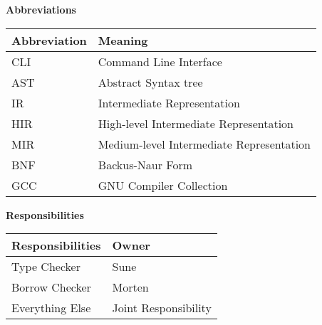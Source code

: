 \textbf{Abbreviations}
\begin{table}[H]
  \label{tab:}
  \begin{tabular}{|p{5cm}|p{5cm}|}
    \hline
    Abbreviation & Meaning\\
    \hline
    CLI & Command Line Interface\\
    \hline
    AST & Abstract Syntax tree\\
    \hline
    IR & Intermediate Representation\\
    \hline
    HIR & High-level Intermediate Representation \\
    \hline
    MIR & Medium-level Intermediate Representation \\
    \hline
    BNF & Backus-Naur Form \\
    \hline 
    GCC & GNU Compiler Collection \\
    \hline
  \end{tabular}
\end{table}

\textbf{Responsibilities}
\begin{table}[H]
  \label{tab:}
  \begin{tabular}{|p{5cm}|p{5cm}|}
    \hline
    Responsibilities & Owner \\
    \hline
    Type Checker & Sune\\
    \hline
    Borrow Checker & Morten\\
    \hline
    Everything Else & Joint Responsibility\\
    \hline
  \end{tabular}
\end{table}



\newpage
